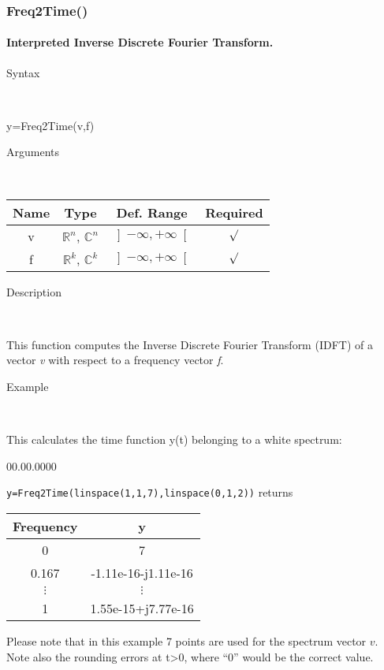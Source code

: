 \newpage
\subsubsection*{\hypertarget{Freq2Time}{}{\Large Freq2Time()}}


\paragraph{\label{par:Interpreted-Inverse-Discrete-Fourier}Interpreted Inverse Discrete Fourier Transform.}

\begin{description}
\item [Syntax]~
\end{description}
y=Freq2Time(v,f)

\begin{description}
\item [Arguments]~
\end{description}
\begin{tabular}{|c|c|c|c|}
\hline 
Name&
Type&
Def. Range&
Required\tabularnewline
\hline
\hline 
v&
$\mathbb{R}^{n}$, $\mathbb{C}^{n}$&
$\left]-\infty,+\infty\right[$&
$\surd$\tabularnewline
\hline 
f&
$\mathbb{R}^{k}$, $\mathbb{C}^{k}$&
$\left]-\infty,+\infty\right[$&
$\surd$\tabularnewline
\hline
\end{tabular}

\begin{description}
\item [Description]~
\end{description}
This function computes the Inverse Discrete Fourier Transform (IDFT)
of a vector \textit{v} with respect to a frequency vector \textit{f}.

\begin{description}
\item [Example]~
\end{description}
This calculates the time function y(t) belonging to a white spectrum:

\begin{lyxlist}{00.00.0000}
\item [\texttt{y=Freq2Time(linspace(1,1,7),linspace(0,1,2))}]returns\\

\begin{tabular}{|c|c|}
\hline 
Frequency&
y\tabularnewline
\hline
\hline 
0&
7\tabularnewline
\hline 
0.167&
-1.11e-16-j1.11e-16\tabularnewline
\hline 
$\vdots$&
$\vdots$\tabularnewline
\hline 
1&
1.55e-15+j7.77e-16\tabularnewline
\hline
\end{tabular}
\end{lyxlist}
Please note that in this example 7 points are used for the spectrum
vector $v$.  Note also the rounding errors at t>0, where {}``0'' would
be the correct value.

